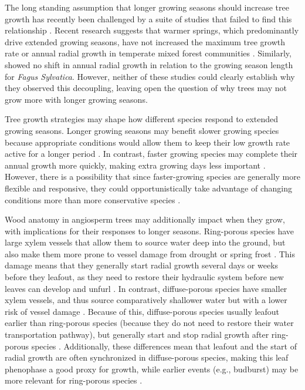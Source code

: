 The long standing assumption that longer growing seasons should increase tree growth has recently been challenged by a suite of studies that failed to find this relationship \citep{dow_warm_2022,silvestro_longer_2023,cufar_variations_2015,charletdesauvage_temperature_2022,cabon_crossbiome_2022}. Recent research suggests that warmer springs, which predominantly drive extended growing seasons, have not increased the maximum tree growth rate or annual radial growth in temperate mixed forest communities \citep{dow_warm_2022}. Similarly, \cite{cufar_variations_2015} showed no shift in annual radial growth in relation to the growing season length for \textit{Fagus Sylvatica}. However, neither of these studies could clearly establish why they observed this decoupling, leaving open the question of why trees may not grow more with longer growing seasons.  

Tree growth strategies may shape how different species respond to extended growing seasons. Longer growing seasons may benefit slower growing species because appropriate conditions would allow them to keep their low growth rate active for a longer period \citep{cuny_life_2012}. In contrast, faster growing species may complete their annual growth more quickly, making extra growing days less important \citep{cuny_life_2012}. However, there is a possibility that since faster-growing species are generally more flexible and responsive, they could opportunistically take advantage of changing conditions more than more conservative species \citep{baumgarten_indeterminacy_2026}.

Wood anatomy in angiosperm trees may additionally impact when they grow, with implications for their responses to longer seasons. Ring-porous species have large xylem vessels that allow them to source water deep into the ground, but also make them more prone to vessel damage from drought or spring frost \citep{taneda_casestudy_2008,kitin_earlywood_2016}. This damage means that they generally start radial growth several days or weeks before they leafout, as they need to restore their hydraulic system before new leaves can develop and unfurl \citep{barbaroux_contrasting_2002,hesslCarbonUptakeStorage2026,savageLeafOutTime2022,dorangeville_peak_2022}. In contrast, diffuse-porous species have smaller xylem vessels, and thus source comparatively shallower water but with a lower risk of vessel damage \citep{yin_ring_2023}. Because of this, diffuse-porous species usually leafout earlier than ring-porous species (because they do not need to restore their water transportation pathway), but generally start and stop radial growth after ring-porous species \citep{michelot_comparing_2012,dorangeville_peak_2022,yin_ring_2023}. Additionally, these differences mean that leafout and the start of radial growth are often synchronized in diffuse-porous species, making this leaf phenophase a good proxy for growth, while earlier events (e.g., budburst) may be more relevant for ring-porous species \citep{cufar_treering_2008}.

